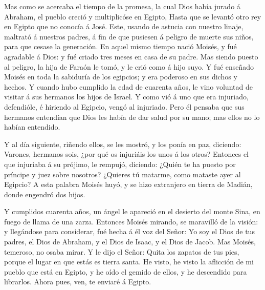  Mas como se acercaba el tiempo de la promesa, la cual Dios
había jurado á Abraham, el pueblo creció y multiplicóse en Egipto,
 Hasta que se levantó otro rey en Egipto que no conocía á
José.  Este, usando de astucia con nuestro linaje, maltrató
á nuestros padres, á fin de que pusiesen á peligro de muerte sus niños,
para que cesase la generación.  En aquel mismo tiempo nació
Moisés, y fué agradable á Dios: y fué criado tres meses en casa de su
padre.  Mas siendo puesto al peligro, la hija de Faraón le
tomó, y le crió como á hijo suyo.  Y fué enseñado Moisés en
toda la sabiduría de los egipcios; y era poderoso en sus dichos y
hechos.  Y cuando hubo cumplido la edad de cuarenta años,
le vino voluntad de visitar á sus hermanos los hijos de Israel.
 Y como vió á uno que era injuriado, defendióle, é hiriendo
al Egipcio, vengó al injuriado.  Pero él pensaba que sus
hermanos entendían que Dios les había de dar salud por su mano; mas
ellos no lo habían entendido.

 Y al día siguiente, riñendo ellos, se les mostró, y los
ponía en paz, diciendo: Varones, hermanos sois, ¿por qué os injuriáis
los unos á los otros?  Entonces el que injuriaba á su
prójimo, le rempujó, diciendo: ¿Quién te ha puesto por príncipe y juez
sobre nosotros?  ¿Quieres tú matarme, como mataste ayer al
Egipcio?  A esta palabra Moisés huyó, y se hizo extranjero
en tierra de Madián, donde engendró dos hijos.

 Y cumplidos cuarenta años, un ángel le apareció en el
desierto del monte Sina, en fuego de llama de una zarza. 
Entonces Moisés mirando, se maravilló de la visión: y llegándose para
considerar, fué hecha á él voz del Señor:  Yo soy el Dios
de tus padres, el Dios de Abraham, y el Dios de Isaac, y el Dios de
Jacob. Mas Moisés, temeroso, no osaba mirar.  Y le dijo el
Señor: Quita los zapatos de tus pies, porque el lugar en que estás es
tierra santa.  He visto, he visto la aflicción de mi pueblo
que está en Egipto, y he oído el gemido de ellos, y he descendido para
librarlos. Ahora pues, ven, te enviaré á Egipto.


